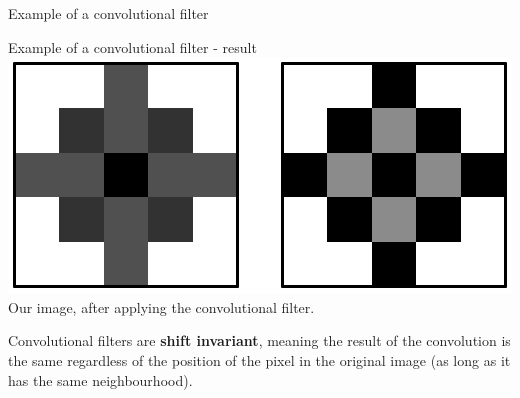 \documentclass[9pt, aspectratio=169]{beamer}
\begin{document}
\begin{frame}
    {Example of a convolutional filter}
    \centering
\end{frame}

\begin{frame}
    {Example of a convolutional filter - result}
    \centering
    \includegraphics[width=.6\textwidth]{example_filter_before_after.png}\\

    Our image, after applying the convolutional filter.

    \pause
    \vspace{1em}
    Convolutional filters are \textbf{shift invariant}, meaning the result of the convolution is the same regardless of the position of the pixel in the original image (as long as it has the same neighbourhood).

\end{frame}
\end{document}

